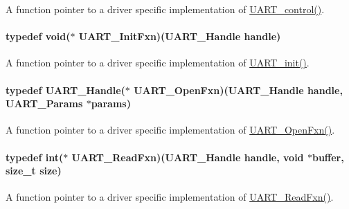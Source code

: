 A function pointer to a driver specific implementation of \hyperlink{_u_a_r_t_8h_a9de3c26cfe4ce6b7f350a6ea6e16801d}{U\-A\-R\-T\-\_\-control()}. 

\paragraph[{U\-A\-R\-T\-\_\-\-Init\-Fxn}]{\setlength{\rightskip}{0pt plus 5cm}typedef void($\ast$ U\-A\-R\-T\-\_\-\-Init\-Fxn)({\bf U\-A\-R\-T\-\_\-\-Handle} handle)}\label{_u_a_r_t_8h_a07f8e43acf7db146a5585e12ee86a2cf}


A function pointer to a driver specific implementation of \hyperlink{_u_a_r_t_8h_ab60a36f7295d704926120d22f806dcd1}{U\-A\-R\-T\-\_\-init()}. 

\paragraph[{U\-A\-R\-T\-\_\-\-Open\-Fxn}]{\setlength{\rightskip}{0pt plus 5cm}typedef {\bf U\-A\-R\-T\-\_\-\-Handle}($\ast$ U\-A\-R\-T\-\_\-\-Open\-Fxn)({\bf U\-A\-R\-T\-\_\-\-Handle} handle, {\bf U\-A\-R\-T\-\_\-\-Params} $\ast$params)}\label{_u_a_r_t_8h_a66aef06e71cd9d94b4baccfa05f60e8a}


A function pointer to a driver specific implementation of \hyperlink{_u_a_r_t_8h_a66aef06e71cd9d94b4baccfa05f60e8a}{U\-A\-R\-T\-\_\-\-Open\-Fxn()}. 

\paragraph[{U\-A\-R\-T\-\_\-\-Read\-Fxn}]{\setlength{\rightskip}{0pt plus 5cm}typedef int($\ast$ U\-A\-R\-T\-\_\-\-Read\-Fxn)({\bf U\-A\-R\-T\-\_\-\-Handle} handle, void $\ast$buffer, size\-\_\-t size)}\label{_u_a_r_t_8h_af7763f31e8786639a1a9e468c03dc57f}


A function pointer to a driver specific implementation of \hyperlink{_u_a_r_t_8h_af7763f31e8786639a1a9e468c03dc57f}{U\-A\-R\-T\-\_\-\-Read\-Fxn()}. 

